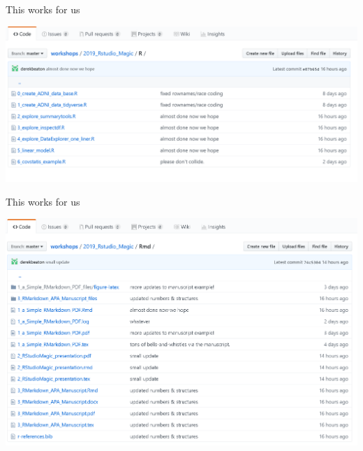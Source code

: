 \documentclass[
  ignorenonframetext,
]{beamer}
\begin{document}
\begin{frame}{This works for us}
\protect\hypertarget{this-works-for-us-1}{}

\includegraphics{../external/images/Rfolder.PNG}

\end{frame}

\begin{frame}{This works for us}
\protect\hypertarget{this-works-for-us-2}{}

\includegraphics{../external/images/RMDfolder.PNG}

\end{frame}
\end{document}
